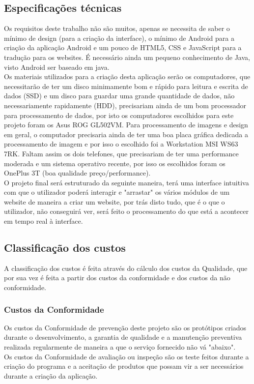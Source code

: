 \documentclass[a4paper]{article}
\begin{document}
\subsection{Especificações técnicas}
Os requisitos deste trabalho não são muitos, apenas se necessita de saber o mínimo de design (para a criação da interface), o mínimo de Android para a criação da aplicação Android e um pouco de HTML5, CSS e JavaScript para a tradução para os websites. É necessário ainda um pequeno conhecimento de Java, visto Android ser baseado em java.\\
Os materiais utilizados para a criação desta aplicação serão os computadores, que necessitarão de ter um disco minimamente bom e rápido para leitura e escrita de dados (SSD) e um disco para guardar uma grande quantidade de dados, não necessariamente rapidamente (HDD), precisariam ainda de um bom processador para processamento de dados, por isto os computadores escolhidos para este projeto foram os Asus ROG GL502VM. Para processamento de imagens e design em geral, o computador precisaria ainda de ter uma boa placa gráfica dedicada a processamento de imagem e por isso o escolhido foi a Workstation MSI WS63 7RK. Faltam assim os dois telefones, que precisariam de ter uma performance moderada e um sistema operativo recente, por isso os escolhidos foram os OnePlus 3T (boa qualidade preço/performance).\\
O projeto final será estruturado da seguinte maneira, terá uma interface intuitiva com que o utilizador poderá interagir e "arrastar" os vários módulos de um website de maneira a criar um website, por trás disto tudo, que é o que o utilizador, não conseguirá ver, será feito o processamento do que está a acontecer em tempo real à interface.

\newpage

\subsection{Classificação dos custos}

A classificação dos custos é feita através do cálculo dos custos da Qualidade, que por sua vez é feita a partir dos custos da conformidade e dos custos da não conformidade.

\subsubsection{Custos da Conformidade}
Os custos da Conformidade de prevenção deste projeto são os protótipos criados durante o desenvolvimento, a garantia de qualidade e a manutenção preventiva realizada regularmente de maneira a que o serviço fornecido não vá "abaixo".\\
Os custos da Conformidade de avaliação ou inspeção são os teste feitos durante a criação do programa e a aceitação de produtos que possam vir a ser necessários durante a criação da aplicação.
\end{document}
